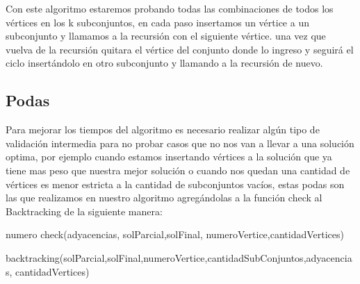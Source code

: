 Con este algoritmo estaremos probando todas las combinaciones de todos los vértices en los k subconjuntos, en cada paso insertamos un vértice a un subconjunto y llamamos a la recursión con el siguiente vértice. una vez que vuelva de la recursión quitara el vértice del conjunto donde lo ingreso y seguirá el ciclo insertándolo en otro subconjunto y llamando a la recursión de nuevo.

\subsection{Podas}
Para mejorar los tiempos del algoritmo es necesario realizar algún tipo de validación intermedia para no probar casos que no nos van a llevar a una solución optima, por ejemplo cuando estamos insertando vértices a la solución que ya tiene mas peso que nuestra mejor solución o cuando nos quedan una cantidad de vértices es menor estricta a la cantidad de subconjuntos vacíos, estas podas son las que realizamos en nuestro algoritmo agregándolas a la función check al Backtracking de la siguiente manera:

\begin{algorithm}
  \begin{algorithmic}[1]\parskip=1mm
 \caption{numero check(adyacencias, solParcial,solFinal, numeroVertice,cantidadVertices)}
  \end{algorithmic}
  \end{algorithm}
  
 \begin{algorithm}
 \begin{algorithmic}[1]\parskip=1mm
 \caption{backtracking(solParcial,solFinal,numeroVertice,cantidadSubConjuntos,adyacencias, cantidadVertices)}

  \end{algorithmic}
  \end{algorithm}

